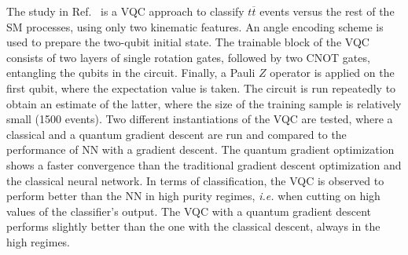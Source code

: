 The study in Ref.~\cite{2021Blance} is a VQC approach to classify $t\overline{t}$ events versus the rest of the SM processes, using only two kinematic features.
An angle encoding scheme is used to prepare the two-qubit initial state.
The trainable block of the VQC consists of two layers of single rotation gates, followed by two CNOT gates, entangling the qubits in the circuit.
Finally, a Pauli $Z$ operator is applied on the first qubit, where the expectation value is taken.
The circuit is run repeatedly to obtain an estimate of the latter, where the size of the training sample is relatively small (1500 events).
Two different instantiations of the VQC are tested, where a classical and a quantum gradient descent are run and compared to the performance of NN with a gradient descent.
The quantum gradient optimization shows a faster convergence than the traditional gradient descent optimization and the classical neural network.
In terms of classification, the VQC is observed to perform better than the NN in high purity regimes, \textit{i.e.} when cutting on high values of the classifier's output.
The VQC with a quantum gradient descent performs slightly better than the one with the classical descent, always in the high regimes.

